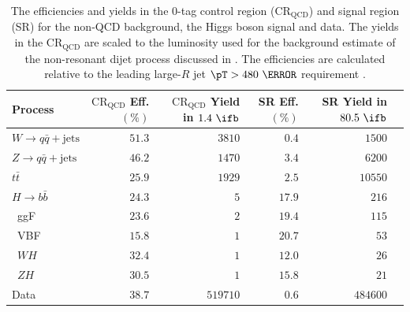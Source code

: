 \begin{table}[htpb]
 \centering
 \caption{The efficiencies and yields in the $0$-tag control region ($\text{CR}_{\text{QCD}}$) and signal region (SR) for the non-QCD background, the Higgs boson signal and data. The yields in the $\text{CR}_{\text{QCD}}$ are scaled to the luminosity used for the background estimate of the non-resonant dijet process discussed in . The efficiencies are calculated relative to the leading large-$R$ jet $\pT > 480~\GeV$ requirement \cite{Krizka:2310645}.}
 \begin{adjustbox}{max width=\textwidth}
  \begin{tabular}{@{}lrrrrr@{}}
   \toprule
   Process                             & $\text{CR}_{\text{QCD}}$ Eff. $(\%)$ & $\text{CR}_{\text{QCD}}$ Yield in $1.4~\ifb$ & SR Eff. $(\%)$ & SR Yield in $80.5~\ifb$ \\ \midrule
   $W \to q\bar{q} + \text{jets}$    & $51.3$               & $3810$                       & $0.4$          & $1500$                  \\
   $Z \to q\bar{q} + \text{jets}$    & $46.2$               & $1470$                       & $3.4$          & $6200$                  \\
   $t\bar{t}$                          & $25.9$               & $1929$                       & $2.5$          & $10550$                 \\
   $H \rightarrow b\bar{b}$                              & $24.3$               & $5$                          & $17.9$         & $216$                   \\
   \phantom{$H \rightarrow b\bar{b}$\quad}~ggF           & $23.6$               & $2$                          & $19.4$         & $115$                   \\
   \phantom{$H \rightarrow b\bar{b}$\quad}~VBF           & $15.8$               & $1$                          & $20.7$         & $53$                    \\
   \phantom{$H \rightarrow b\bar{b}$\quad}~$WH$          & $32.4$               & $1$                          & $12.0$         & $26$                    \\
   \phantom{$H \rightarrow b\bar{b}$\quad}~$ZH$          & $30.5$               & $1$                          & $15.8$         & $21$                    \\
   Data                                & $38.7$               & $519710$                     & $0.6$          & $484600$                \\
   \bottomrule
  \end{tabular}
 \end{adjustbox}
 \label{table:efficiencies_and_yields}
\end{table}

